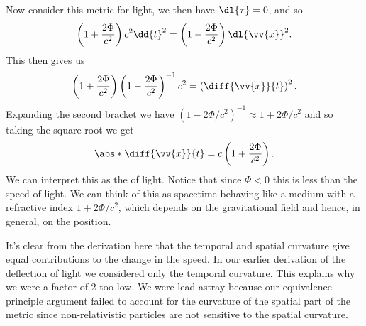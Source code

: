 \documentclass[fleqn]{NotesClass}
\begin{document}
    Now consider this metric for light, we then have \(\dl{\tau} = 0\), and so
    \begin{equation}
        \left( 1 + \frac{2\Phi}{c^2} \right) c^2 \dd{t}^2 = \left( 1 - \frac{2\Phi}{c^2} \right)\dl{\vv{x}}^2.
    \end{equation}
    This then gives us
    \begin{equation}
        \left( 1 + \frac{2\Phi}{c^2} \right) \left( 1 - \frac{2\Phi}{c^2} \right)^{-1} c^2 = \left( \diff{\vv{x}}{t} \right)^2.
    \end{equation}
    Expanding the second bracket we have \((1 - 2\Phi/c^2)^{-1} \approx 1 + 2\Phi/c^2\) and so taking the square root we get
    \begin{equation}
        \abs*{\diff{\vv{x}}{t}} = c\left( 1 + \frac{2\Phi}{c^2} \right).
    \end{equation}
    We can interpret this as the  of light.
    Notice that since \(\Phi < 0\) this is less than the speed of light.
    We can think of this as spacetime behaving like a medium with a refractive index \(1 + 2\Phi/c^2\), which depends on the gravitational field and hence, in general, on the position.
    
    It's clear from the derivation here that the temporal and spatial curvature give equal contributions to the change in the speed.
    In our earlier derivation of the deflection of light we considered only the temporal curvature.
    This explains why we were a factor of 2 too low.
    We were lead astray because our equivalence principle argument failed to account for the curvature of the spatial part of the metric since non-relativistic particles are not sensitive to the spatial curvature.
    
\end{document}
